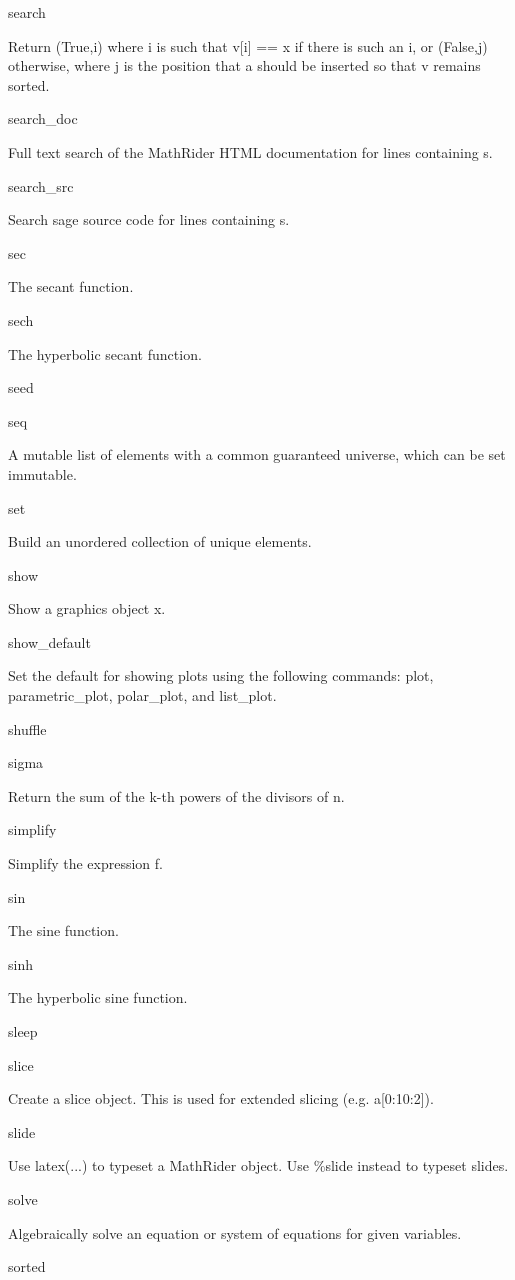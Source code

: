 \documentclass[12pt,oneside]{book}
\begin{document}
search

Return (True,i) where i is such that v[i] == x if there is such an i, or (False,j) otherwise, where j is the position that a should be inserted so that v remains sorted.

search\_doc

Full text search of the MathRider HTML documentation for lines containing s.

search\_src

Search sage source code for lines containing s.

sec

The secant function.

sech

The hyperbolic secant function.

seed


seq

A mutable list of elements with a common guaranteed universe, which can be set immutable.

set

Build an unordered collection of unique elements.

show

Show a graphics object x.

show\_default

Set the default for showing plots using the following commands: plot, parametric\_plot, polar\_plot, and list\_plot.

shuffle


sigma

Return the sum of the k{}-th powers of the divisors of n.

simplify

Simplify the expression f.

sin

The sine function.

sinh

The hyperbolic sine function.

sleep


slice

Create a slice object. This is used for extended slicing (e.g. a[0:10:2]).

slide

Use latex(...) to typeset a MathRider object. Use \%slide instead to typeset slides.

solve

Algebraically solve an equation or system of equations for given variables.

sorted
\end{document}
